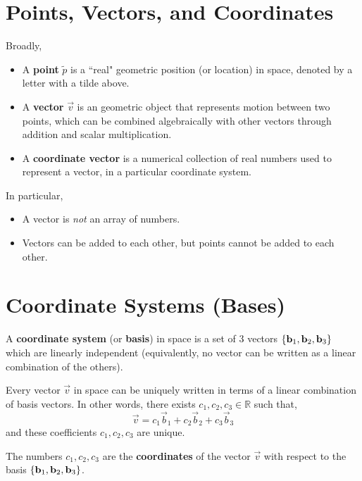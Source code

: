 \documentclass[letterpaper,12pt]{article}
\begin{document}
\section*{Points, Vectors, and Coordinates}
\begin{definition}
Broadly,
\begin{itemize}
    \item A \textbf{point} $\tilde{p}$ is a ``real" geometric position (or location) in space, denoted by a letter with a tilde above.
    \item A \textbf{vector} $\vec{v}$ is an geometric object that represents motion between two points, which can be combined algebraically with other vectors through addition and scalar multiplication.
    \item A \textbf{coordinate vector} is a numerical collection of real numbers used to represent a vector, in a particular coordinate system.
\end{itemize}
\end{definition}

In particular,
\begin{itemize}
    \item A vector is \textit{not} an array of numbers.
    \item Vectors can be added to each other, but points cannot be added to each other.
\end{itemize}

\section*{Coordinate Systems (Bases)}
\begin{definition}
A \textbf{coordinate system} (or \textbf{basis}) in space is a set of 3 vectors $\left\{ \mathbf{b}_1, \mathbf{b}_2, \mathbf{b}_3 \right\}$ which are linearly independent (equivalently, no vector can be written as a linear combination of the others).
\end{definition}

Every vector $\vec{v}$ in space can be uniquely written in terms of a linear combination of basis vectors. In other words, there exists $c_1, c_2, c_3 \in \mathbb{R}$ such that,
\begin{equation*}
    \boxed{\vec{v} = c_1 \vec{b}_1 + c_2 \vec{b}_2 + c_3 \vec{b}_3}
\end{equation*}
and these coefficients $c_1, c_2, c_3$ are unique.

\begin{definition}
The numbers $c_1, c_2, c_3$ are the \textbf{coordinates} of the vector $\vec{v}$ with respect to the basis $\left\{ \mathbf{b}_1, \mathbf{b}_2, \mathbf{b}_3 \right\}$.
\end{definition}
\end{document}
